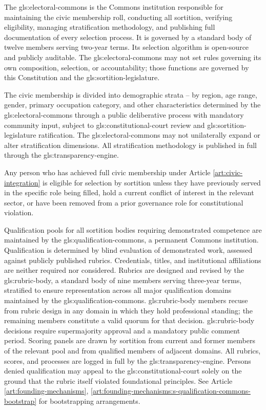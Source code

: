 The \gls{gls:electoral-commons} is the Commons institution responsible for maintaining the civic membership roll, conducting all sortition, verifying eligibility, managing stratification methodology, and publishing full documentation of every selection process. It is governed by a standard body of twelve members serving two-year terms. Its selection algorithm is open-source and publicly auditable. The \gls{gls:electoral-commons} may not set rules governing its own composition, selection, or accountability; those functions are governed by this Constitution and the \gls{gls:sortition-legislature}.

The civic membership is divided into demographic strata -- by region, age range, gender, primary occupation category, and other characteristics determined by the \gls{gls:electoral-commons} through a public deliberative process with mandatory community input, subject to \gls{gls:constitutional-court} review and \gls{gls:sortition-legislature} ratification. The \gls{gls:electoral-commons} may not unilaterally expand or alter stratification dimensions. All stratification methodology is published in full through the \gls{gls:transparency-engine}.

Any person who has achieved full civic membership under Article \ref{art:civic-integration} is eligible for selection by sortition unless they have previously served in the specific role being filled, hold a current conflict of interest in the relevant sector, or have been removed from a prior governance role for constitutional violation.

Qualification pools for all sortition bodies requiring demonstrated competence are maintained by the \gls{gls:qualification-commons}, a permanent Commons institution. Qualification is determined by blind evaluation of demonstrated work, assessed against publicly published rubrics. Credentials, titles, and institutional affiliations are neither required nor considered. Rubrics are designed and revised by the \gls{gls:rubric-body}, a standard body of nine members serving three-year terms, stratified to ensure representation across all major qualification domains maintained by the \gls{gls:qualification-commons}. \gls{gls:rubric-body} members recuse from rubric design in any domain in which they hold professional standing; the remaining members constitute a valid quorum for that decision. \gls{gls:rubric-body} decisions require supermajority approval and a mandatory public comment period. Scoring panels are drawn by sortition from current and former members of the relevant pool and from qualified members of adjacent domains. All rubrics, scores, and processes are logged in full by the \gls{gls:transparency-engine}. Persons denied qualification may appeal to the \gls{gls:constitutional-court} solely on the ground that the rubric itself violated foundational principles. See Article \ref{art:founding-mechanisms}, \ref{art:founding-mechanisms:s-qualification-commons-bootstrap} for bootstrapping arrangements.

